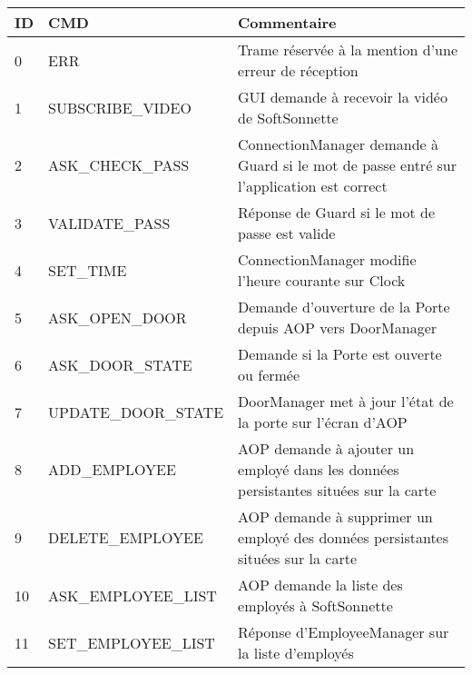             \begin {table}[H]
            \center
            \begin{tabularx}{\textwidth}{|p{0.5cm}|X|X|}
                \hline
                \textbf{ID} & \textbf{CMD} & \textbf{Commentaire} \\
                \hline
                0 & ERR & Trame réservée à la mention d'une erreur de réception \\
                \hline
                1 & SUBSCRIBE\_VIDEO & GUI demande à recevoir la vidéo de SoftSonnette \\
                \hline 
                2 & ASK\_CHECK\_PASS & ConnectionManager demande à Guard si le mot de passe entré sur l'application est correct \\
                \hline
                3 & VALIDATE\_PASS & Réponse de Guard si le mot de passe est valide \\
                \hline
                4 & SET\_TIME & ConnectionManager modifie l'heure courante sur Clock \\
                \hline
                5 & ASK\_OPEN\_DOOR & Demande d'ouverture de la Porte depuis AOP vers DoorManager\\
                \hline
                6 & ASK\_DOOR\_STATE & Demande si la Porte est ouverte ou fermée \\
                \hline
                7 & UPDATE\_DOOR\_STATE & DoorManager met à jour l'état de la porte sur l'écran d'AOP \\
                \hline
                8 & ADD\_EMPLOYEE & AOP demande à ajouter un employé dans les données persistantes situées sur la carte \\
                \hline
                9 & DELETE\_EMPLOYEE & AOP demande à supprimer un employé des données persistantes situées sur la carte \\
                \hline
                10 & ASK\_EMPLOYEE\_LIST & AOP demande la liste des employés à SoftSonnette \\
                \hline
                11 & SET\_EMPLOYEE\_LIST & Réponse d'EmployeeManager sur la liste d'employés \\
                \hline
            \end{tabularx}
            \end{table}


